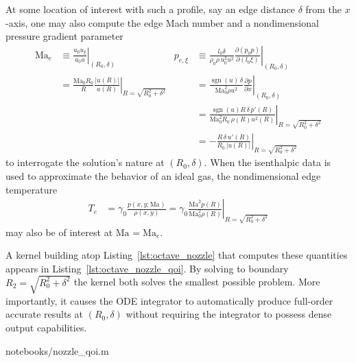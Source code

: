 \documentclass[letterpaper,11pt,nointlimits,reqno]{amsart}
\newcommand{\Mach}[1][]{\mbox{Ma}_{#1}}
\begin{document}
At some location of interest with such a profile, say an edge distance
$\delta$ from the $x$-axis, one may also compute the edge Mach number
and a nondimensional pressure gradient parameter
\begin{align}
  \Mach[e]{}
  &\equiv
  \left. \frac{u_0 u_\xi}{a_0 a} \right|_{\left(R_0,\delta\right)}
&
  p_{e,\xi}
  &\equiv
  \left.
  \frac{l_0 \delta}{\rho_0 \rho \, u_0^2 u^2}
    \frac{\partial\left(p_0 p\right)}{\partial\left(l_0 \xi\right)}
  \right|_{\left(R_0,\delta\right)}
\\&=
  \left.
    \frac{\Mach[0]{} R_0}{R}
    \frac{\left|u\!\left(R\right)\right|}
         {      a\!\left(R\right)       }
  \right|_{R = \sqrt{R_0^2 + \delta^2}}
&
  &=
  \left.
    \frac{\operatorname{sgn}(u) \, \delta}{\Mach[0]^2 \rho u^2}
      \frac{\partial{}p}{\partial{}x}
  \right|_{\left(R_0,\delta\right)}
\\
&&
  &=
  \left.
    \frac{\operatorname{sgn}(u) R \, \delta \, p'\!\left(R\right)}
         {\Mach[0]^2 R_0 \, \rho\!\left(R\right) u^2\!\left(R\right)}
  \right|_{R=\sqrt{R_0^2 + \delta^2}}
\\
&&
  &=
  - \left.
      \frac{R \, \delta \, u'\!\left(R\right)}
           {R_0 \, \left|u\!\left(R\right)\right|}
  \right|_{R=\sqrt{R_0^2 + \delta^2}}
\label{eq:qoidef}
\end{align}
to interrogate the solution's nature at $\left(R_0, \delta\right)$. When the
isenthalpic data is used to approximate the behavior of an ideal gas, the
nondimensional edge temperature
\begin{align}
    T_e &= \gamma_0 \frac{p\!\left(x,y;\Mach\right)}{\rho\!\left(x,y\right)}
         = \left. \gamma_0 \frac{\Mach^2    p   \!\left(R\right)}
                                {\Mach[0]^2 \rho\!\left(R\right)}
           \right|_{R=\sqrt{R_0^2 + \delta^2}}
\label{eq:Tedef}
\end{align}
may also be of interest at $\Mach = \Mach[e]$.

A kernel building atop Listing~\ref{lst:octave_nozzle} that computes these
quantities appears in Listing~\ref{lst:octave_nozzle_qoi}. By solving to
boundary $R_2 = \sqrt{R_0^2 + \delta^2}$ the kernel both solves the smallest
possible problem.  More importantly, it causes the ODE integrator to
automatically produce full-order accurate results at $\left(R_0,\delta\right)$
without requiring the integrator to possess dense output capabilities.


                {notebooks/nozzle_qoi.m}
\end{document}
